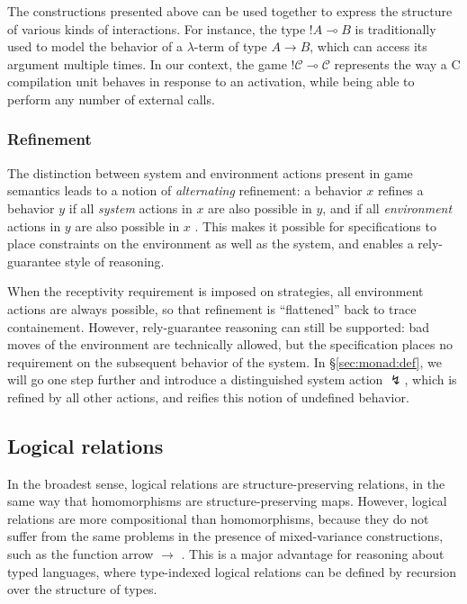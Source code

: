 \documentclass[acmsmall,timestamp,review,anonymous]{acmart}
\begin{document}
The constructions presented above can be used together
to express the structure of various kinds of interactions.
For instance,
the type $!A \multimap B$ is traditionally used
to model the behavior of a $\lambda$-term of type $A \rightarrow B$,
which can access its argument multiple times.
In our context,
the game $!\mathcal{C} \multimap \mathcal{C}$
represents the way a C compilation unit behaves in response to
an activation,
while being able to perform any number of external calls.


\subsubsection{Refinement} \label{sec:mainideas:gs:ref} %

The distinction between system and environment actions
present in game semantics
leads to a notion of \emph{alternating} refinement:
a behavior $x$ refines a behavior $y$ if
all \emph{system} actions in $x$ are also possible in $y$, and if
all \emph{environment} actions in $y$ are also possible in $x$
\cite{altref,gmos}.
This makes it possible for specifications to
place constraints on the environment as well as the system,
and enables a rely-guarantee style of reasoning.

When the receptivity requirement is imposed on strategies,
all environment actions are always possible,
so that refinement is ``flattened'' back to trace containement.
However,
rely-guarantee reasoning can still be supported:
bad moves of the environment are technically allowed,
but the specification places no requirement on
the subsequent behavior of the system.
In \S\ref{sec:monad:def},
we will go one step further and introduce a distinguished
system action $\lightning$,
which is refined by all other actions,
and reifies this notion of undefined behavior.



\subsection{Logical relations} %

In the broadest sense,
logical relations are structure-preserving relations,
in the same way that homomorphisms are structure-preserving maps.
However,
logical relations are more compositional than homomorphisms,
because they do not suffer from the same problems
in the presence of mixed-variance constructions,
such as the function arrow $\rightarrow$ \cite{lrp}.
This is a major advantage
for reasoning about typed languages,
where type-indexed logical relations
can be defined by recursion over the structure of types.
\end{document}
